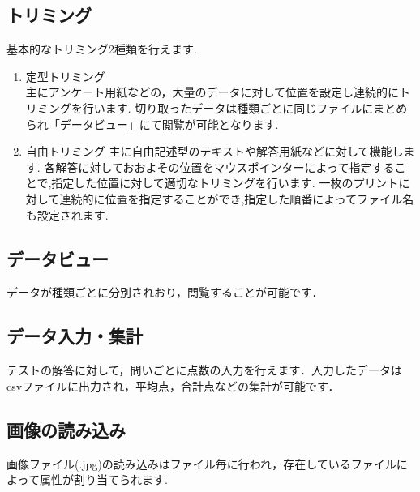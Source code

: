\documentclass[12pt]{jsreport}
\begin{document}
\subsection{トリミング}
基本的なトリミング2種類を行えます.

\begin{enumerate}
    \item 定型トリミング \\
    主にアンケート用紙などの，大量のデータに対して位置を設定し連続的にトリミングを行います.
    切り取ったデータは種類ごとに同じファイルにまとめられ「データビュー」にて閲覧が可能となります.
    \item 自由トリミング
    主に自由記述型のテキストや解答用紙などに対して機能します.
    各解答に対しておおよその位置をマウスポインターによって指定することで,指定した位置に対して適切なトリミングを行います.
    一枚のプリントに対して連続的に位置を指定することができ,指定した順番によってファイル名も設定されます.

\end{enumerate}

\subsection{データビュー}
データが種類ごとに分別されおり，閲覧することが可能です．
\subsection{データ入力・集計}
テストの解答に対して，問いごとに点数の入力を行えます．入力したデータはcsvファイルに出力され，平均点，合計点などの集計が可能です．
\subsection{画像の読み込み}
画像ファイル(.jpg)の読み込みはファイル毎に行われ，存在しているファイルによって属性が割り当てられます.

\newpage
\end{document}
